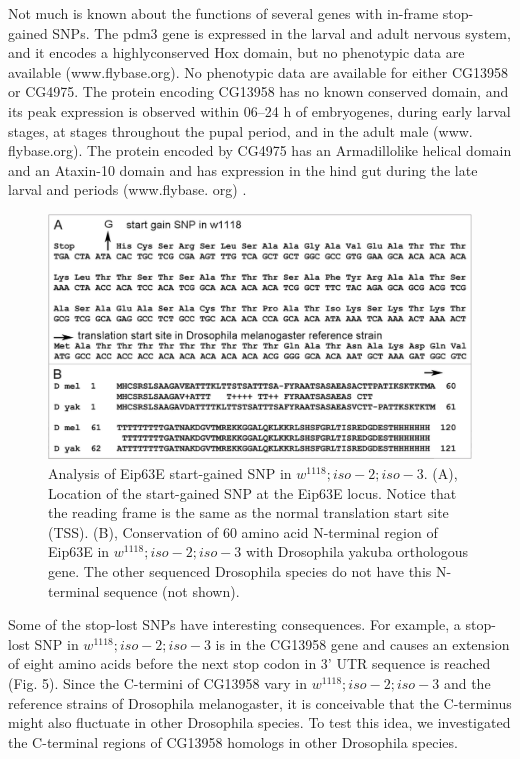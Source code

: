 Not much is known about the functions of several genes with in-frame stop-gained SNPs. The pdm3 gene is expressed in the larval and adult nervous system, and it encodes a highlyconserved Hox domain, but no phenotypic data are available (www.flybase.org). No phenotypic data are available for either CG13958 or CG4975. The protein encoding CG13958 has no known conserved domain, and its peak expression is observed within 06–24 h of embryogenes, during early larval stages, at stages throughout the pupal period, and in the adult male (www.  flybase.org). The protein encoded by CG4975 has an Armadillolike helical domain and an Ataxin-10 domain and has expression in the hind gut during the late larval and periods (www.flybase.  org) \cite{chintapalli2007using}.

\begin{figure}
    \centering
    \includegraphics[width=14cm]{snpeff_fig2.png}
    \caption{Analysis of Eip63E start-gained SNP in $w^{1118} ; iso-2; iso-3$. (A), Location of the start-gained SNP at the Eip63E locus. Notice that the reading frame is the same as the normal translation start site (TSS). (B), Conservation of 60 amino acid N-terminal region of Eip63E in $w^{1118} ; iso-2; iso-3$ with Drosophila yakuba orthologous gene. The other sequenced Drosophila species do not have this N-terminal sequence (not shown).}
    \label{fig:snpeffTab3}
\end{figure}

Some of the stop-lost SNPs have interesting consequences. For example, a stop-lost SNP in $w^{1118} ; iso-2; iso-3$ is in the CG13958 gene and causes an extension of eight amino acids before the next stop codon in 3' UTR sequence is reached (Fig. 5). Since the C-termini of CG13958 vary in $w^{1118} ; iso-2; iso-3$ and the reference strains of Drosophila melanogaster, it is conceivable that the C-terminus might also fluctuate in other Drosophila species. To test this idea, we investigated the C-terminal regions of CG13958 homologs in other Drosophila species.


